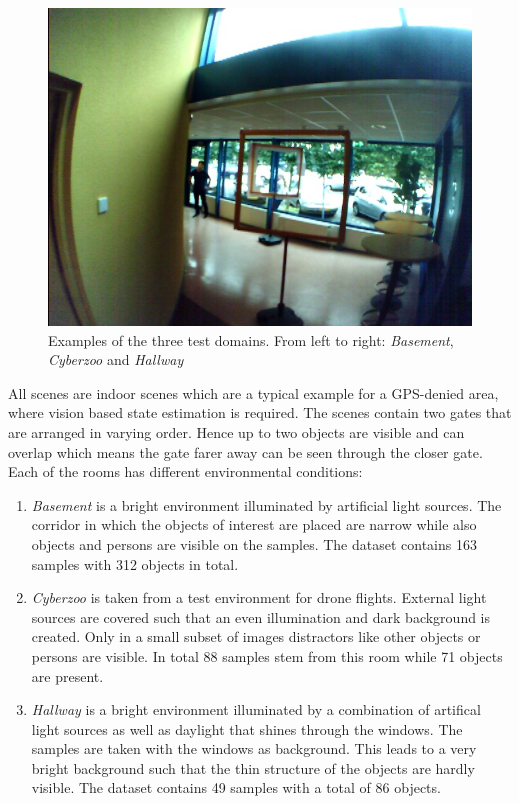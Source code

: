\begin{figure}
\begin{minipage}{0.3\textwidth}
\end{minipage}\hfill
	\begin{minipage}{0.3\textwidth}
	\includegraphics[width=\textwidth]{fig/hallway}
\end{minipage}
\caption{Examples of the three test domains. From left to right: \textit{Basement}, \textit{Cyberzoo} and \textit{Hallway}}
\label{fig:example_real_set}
\end{figure}

All scenes are indoor scenes which are a typical example for a GPS-denied area, where vision based state estimation is required. The scenes contain two gates that are arranged in varying order. Hence up to two objects are visible and can overlap which means the gate farer away can be seen through the closer gate. Each of the rooms has different environmental conditions:
\begin{enumerate}
	\item \textit{Basement} is a bright environment illuminated by artificial light sources. The corridor in which the objects of interest are placed are narrow while also objects and persons are visible on the samples. The dataset contains 163 samples with 312 objects in total.
	\item \textit{Cyberzoo} is taken from a test environment for drone flights. External light sources are covered such that an even illumination and dark background is created. Only in a small subset of images distractors like other objects or persons are visible. In total 88 samples stem from this room while 71 objects are present.
	\item \textit{Hallway} is a bright environment illuminated by a combination of artifical light sources as well as daylight that shines through the windows. The samples are taken with the windows as background. This leads to a very bright background such that the thin structure of the objects are hardly visible. The dataset contains 49 samples with a total of 86 objects.
\end{enumerate}

